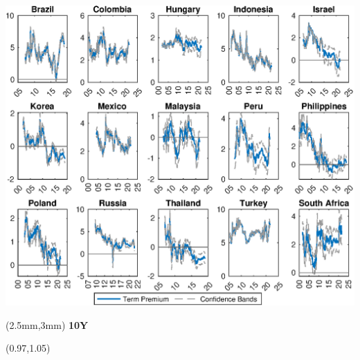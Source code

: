 \documentclass[12pt, aspectratio=169, xcolor=dvipsnames]{beamer}
\begin{document}
\begin{frame}[label=tpCI]
\begin{center}							%
\includegraphics[trim={0cm 0cm 0cm 0cm},clip,height=0.95\textheight,width=\linewidth]{../Figures/Estimation/bsl_tp_CI_10y_V1.eps} \\
\end{center}
\begin{textblock*}{15cm}(2.5mm,3mm)
	\textbf{10Y}
\end{textblock*}
\begin{textblock*}{5cm}(0.97\textwidth,1.05\textheight)
\hyperlink{YldDcmp10}{}
\end{textblock*}
\end{frame}
\end{document}
